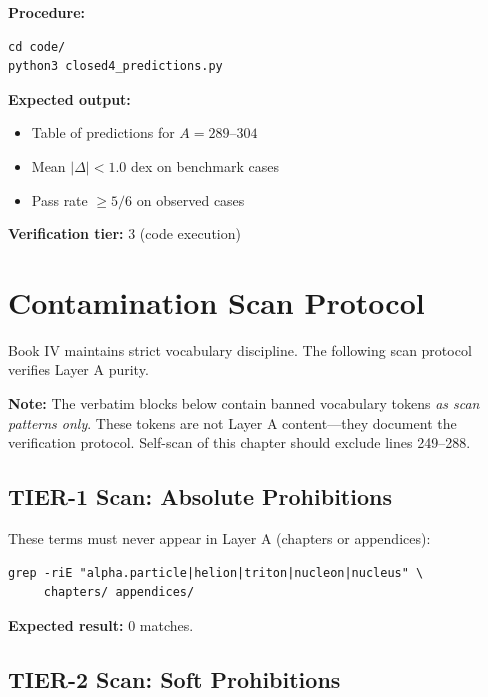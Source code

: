 \textbf{Procedure:}
\begin{verbatim}
cd code/
python3 closed4_predictions.py
\end{verbatim}

\textbf{Expected output:}
\begin{itemize}
    \item Table of predictions for $A = 289$--$304$
    \item Mean $|\Delta| < 1.0$ dex on benchmark cases
    \item Pass rate $\geq 5/6$ on observed cases
\end{itemize}

\textbf{Verification tier:} 3 (code execution)

\section{Contamination Scan Protocol}
\label{sec:repro:contamination}

Book IV maintains strict vocabulary discipline. The following scan protocol
verifies Layer A purity.

\begin{tcolorbox}[colback=gray!5,colframe=gray!50!black]
\textbf{Note:} The verbatim blocks below contain banned vocabulary tokens
\emph{as scan patterns only}. These tokens are not Layer A content---they
document the verification protocol. Self-scan of this chapter should exclude
lines 249--288.
\end{tcolorbox}

\subsection{TIER-1 Scan: Absolute Prohibitions}

These terms must never appear in Layer A (chapters or appendices):

\begin{verbatim}
grep -riE "alpha.particle|helion|triton|nucleon|nucleus" \
     chapters/ appendices/
\end{verbatim}

\textbf{Expected result:} 0 matches.

\subsection{TIER-2 Scan: Soft Prohibitions}

